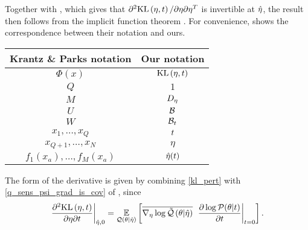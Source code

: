 
Together with , which gives that $\partial^2
\mathrm{KL}\left(\eta, t\right) / \partial \eta \partial\eta^T$ is invertible at $\hat\eta$, the
result then follows from the implicit function theorem \citet[Theorem
3.3.1]{krantz:2012:implicit}. For convenience,  shows the
correspondence between their notation and ours.

\begin{center}
\begin{tabular}{|c|c|}
%
\hline Krantz \& Parks notation & Our notation \\\hline
$\Phi(x)$                       & $\mathrm{KL}\left(\eta, t\right)$ \\\hline
$Q$                             & $1$ \\\hline
$M$                             & ${D_{\eta}}$ \\\hline
$U$                             & $\mathcal{B}$ \\\hline
$W$                             & $\mathcal{B}_t$ \\\hline
$x_1,\ldots,x_Q$                & $t$ \\\hline
$x_{Q+1},\ldots,x_N$            & $\eta$ \\\hline
$f_1(x_a), \ldots,f_M(x_a)$     & $\hat\eta(t)$ \\\hline
%
\end{tabular}
\end{center}

The form of the derivative is given by combining \eqref{kl_pert} with
\eqref{q_sens_psi_grad_is_cov} of , since
%
\begin{align*}
%
\fracat{\partial^2 \KL{\eta, \t}}
       {\partial \eta \partial \t}
       {\etaopt, 0} =
\expect{\q(\theta \vert \etaopt)}{
    \lqgradbar{\theta \vert \etaopt}
    \fracat{\partial \log \p(\theta \vert \t)}{\partial \t}{\t=0}
}.
%
\end{align*}
%



